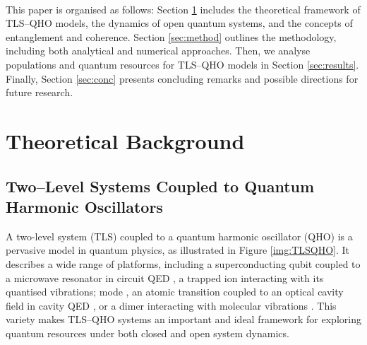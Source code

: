 \documentclass[11pt]{article}
\begin{document}
\\
This paper is organised as follows: Section \ref{sec:theory} includes the theoretical framework of TLS--QHO models, the dynamics of open quantum systems, and the concepts of entanglement and coherence. Section \ref{sec:method} outlines the methodology, including both analytical and numerical approaches. Then, we analyse populations and quantum resources for TLS--QHO models in Section \ref{sec:results}. Finally, Section  \ref{sec:conc} presents concluding remarks and possible directions for future research.


\newpage

\section{Theoretical Background} \label{sec:theory}



\subsection{Two--Level Systems Coupled to Quantum Harmonic Oscillators} \label{sec:theory_sub_TLSQHO}

A two-level system (TLS) coupled to a quantum harmonic oscillator (QHO) is a pervasive model in quantum physics, as illustrated in Figure \ref{img:TLSQHO}. It describes a wide range of platforms, including a superconducting qubit coupled to a microwave resonator in circuit QED \cite{Context2024-CircuitQED}, a trapped ion interacting with its quantised vibrations; mode \cite{Context1992-Trapped_ions}, an atomic transition coupled to an optical cavity field in cavity QED \cite{Context2024-CQED_JCM}, or a dimer interacting with molecular vibrations \cite{ExVib2014-Alexandra}. This variety makes TLS–QHO systems an important and ideal framework for exploring quantum resources under both closed and open system dynamics.\\
\end{document}
